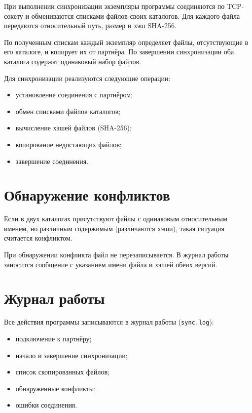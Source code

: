 \documentclass[12pt,a4paper]{article}
\begin{document}
При выполнении синхронизации экземпляры программы соединяются по TCP-сокету и обмениваются списками файлов своих каталогов. Для каждого файла передаются относительный путь, размер и хэш SHA-256.

По полученным спискам каждый экземпляр определяет файлы, отсутствующие в его каталоге, и копирует их от партнёра. По завершении синхронизации оба каталога содержат одинаковый набор файлов.

Для синхронизации реализуются следующие операции:

\begin{itemize}[nosep]
    \item установление соединения с партнёром;
    \item обмен списками файлов каталогов;
    \item вычисление хэшей файлов (SHA-256);
    \item копирование недостающих файлов;
    \item завершение соединения.
\end{itemize}

\section{Обнаружение конфликтов}

Если в двух каталогах присутствуют файлы с одинаковым относительным именем, но различным содержимым (различаются хэши), такая ситуация считается конфликтом.

При обнаружении конфликта файл не перезаписывается. В журнал работы заносится сообщение с указанием имени файла и хэшей обеих версий.

\section{Журнал работы}

Все действия программы записываются в журнал работы (\texttt{sync.log}):

\begin{itemize}[nosep]
    \item подключение к партнёру;
    \item начало и завершение синхронизации;
    \item список скопированных файлов;
    \item обнаруженные конфликты;
    \item ошибки соединения.
\end{itemize}
\end{document}
